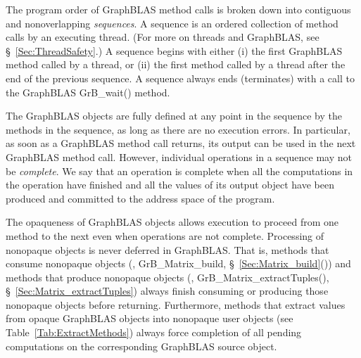 The program order of GraphBLAS method calls is broken down into
contiguous and nonoverlapping \emph{sequences}.  A sequence is an
ordered collection of method calls by an executing thread. (For more
on threads and GraphBLAS, see \S~\ref{Sec:ThreadSafety}.)  A sequence
begins with either (i) the first GraphBLAS method called by a thread, or
(ii) the first method called by a thread after the end of the previous
sequence. A sequence always ends (terminates) with a call to the GraphBLAS
{\sf GrB\_wait()} method.

The GraphBLAS objects are fully defined at any point in the sequence by the
methods in the sequence, as long as there are no execution errors.
In particular, as soon as a GraphBLAS
method call returns, its output can be used in the next GraphBLAS
method call.  However, individual operations in a sequence may not
be \emph{complete}. We say that an operation is complete when all the
computations in the operation have finished and all the values of its
output object have been produced and committed to the address 
space of the program.

The opaqueness of GraphBLAS objects allows execution to proceed
from one method to the next even when operations are not complete.
Processing of nonopaque objects is never deferred in GraphBLAS. That is,
methods that consume nonopaque objects (\eg, {\sf GrB\_Matrix\_build},
\S~\ref{Sec:Matrix_build}()) and methods that produce nonopaque objects (\eg,
{\sf GrB\_Matrix\_extractTuples()}, \S~\ref{Sec:Matrix_extractTuples})
always finish consuming or producing those nonopaque objects before
returning. 
Furthermore, methods that extract values from opaque GraphBLAS objects
into nonopaque user objects (see Table~\ref{Tab:ExtractMethods})
always force completion of all pending computations on the 
corresponding GraphBLAS source object.

